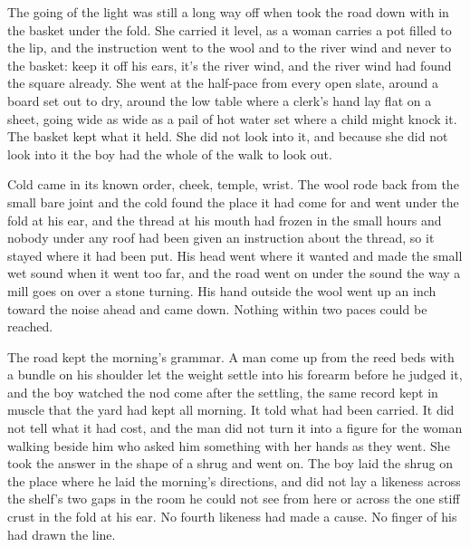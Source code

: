 The going of the light was still a long way off when  took the road down with  in the basket under the fold. She carried it level, as a woman carries a pot filled to the lip, and the instruction went to the wool and to the river wind and never to the basket: keep it off his ears, it's the river wind, and the river wind had found the square already. She went at the half-pace from every open slate, around a board set out to dry, around the low table where a clerk's hand lay flat on a sheet, going wide as wide as a pail of hot water set where a child might knock it. The basket kept what it held. She did not look into it, and because she did not look into it the boy had the whole of the walk to look out.

Cold came in its known order, cheek, temple, wrist. The wool rode back from the small bare joint and the cold found the place it had come for and went under the fold at his ear, and the thread at his mouth had frozen in the small hours and nobody under any roof had been given an instruction about the thread, so it stayed where it had been put. His head went where it wanted and made the small wet sound when it went too far, and the road went on under the sound the way a mill goes on over a stone turning. His hand outside the wool went up an inch toward the noise ahead and came down. Nothing within two paces could be reached.

The road kept the morning's grammar. A man come up from the reed beds with a bundle on his shoulder let the weight settle into his forearm before he judged it, and the boy watched the nod come after the settling, the same record kept in muscle that the yard had kept all morning. It told what had been carried. It did not tell what it had cost, and the man did not turn it into a figure for the woman walking beside him who asked him something with her hands as they went. She took the answer in the shape of a shrug and went on. The boy laid the shrug on the place where he laid the morning's directions, and did not lay a likeness across the shelf's two gaps in the room he could not see from here or across the one stiff crust in the fold at his ear. No fourth likeness had made a cause. No finger of his had drawn the line.

